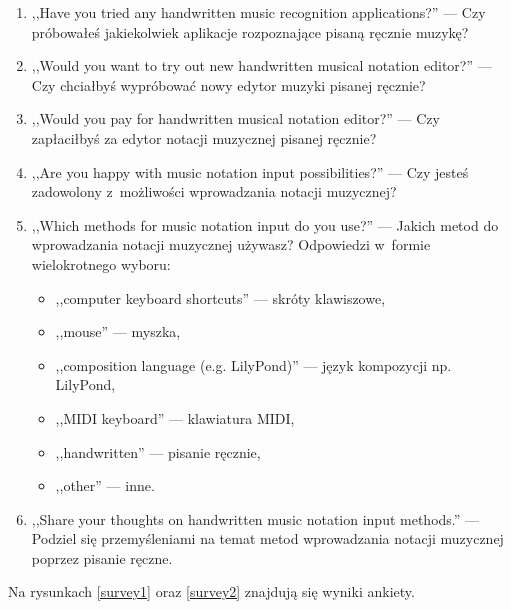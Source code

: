 \documentclass[polish,thesis,12pt]{dcsbook}
\begin{document}
\begin{enumerate}
  \item ,,Have you tried any handwritten music recognition applications?'' --- Czy próbowałeś jakiekolwiek aplikacje rozpoznające pisaną ręcznie muzykę?
  \item ,,Would you want to try out new handwritten musical notation editor?'' --- Czy chciałbyś wypróbować nowy edytor muzyki pisanej ręcznie?
  \item ,,Would you pay for handwritten musical notation editor?'' --- Czy zapłaciłbyś za edytor notacji muzycznej pisanej ręcznie?
  \item ,,Are you happy with music notation input possibilities?'' --- Czy jesteś zadowolony z~możliwości wprowadzania notacji muzycznej?
  \item ,,Which methods for music notation input do you use?'' --- Jakich metod do wprowadzania notacji muzycznej używasz? Odpowiedzi w~formie wielokrotnego wyboru:
        \begin{itemize}
          \item ,,computer keyboard shortcuts'' --- skróty klawiszowe,
          \item ,,mouse'' --- myszka,
          \item ,,composition language (e.g. LilyPond)'' --- język kompozycji np. LilyPond,
          \item ,,MIDI keyboard'' --- klawiatura MIDI,
          \item ,,handwritten'' --- pisanie ręcznie,
          \item ,,other'' --- inne.
        \end{itemize}
  \item ,,Share your thoughts on handwritten music notation input methods.'' --- Podziel się przemyśleniami na temat metod wprowadzania notacji muzycznej poprzez pisanie ręczne.
\end{enumerate}

Na rysunkach \ref{survey1} oraz \ref{survey2} znajdują się wyniki ankiety.
\end{document}
